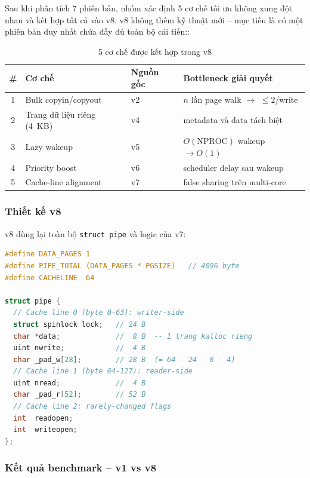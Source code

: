 \documentclass[12pt,a4paper]{article}
\newcommand{\code}[1]{\texttt{#1}}
\begin{document}
Sau khi phân tích 7 phiên bản, nhóm xác định 5 cơ chế tối ưu không xung đột nhau và
kết hợp tất cả vào v8. v8 không thêm kỹ thuật mới -- mục tiêu là có một phiên bản
duy nhất chứa đầy đủ toàn bộ cải tiến::

\begin{table}[H]
\centering
\caption{5 cơ chế được kết hợp trong v8}
\begin{tabular}{clll}
\toprule
\textbf{\#} & \textbf{Cơ chế} & \textbf{Nguồn gốc} & \textbf{Bottleneck giải quyết} \\
\midrule
1 & Bulk copyin/copyout & v2 & $n$ lần page walk $\to$ $\leq 2$/write \\
2 & Trang dữ liệu riêng (4~KB) & v4 & metadata và data tách biệt \\
3 & Lazy wakeup & v5 & $O(\text{NPROC})$ wakeup $\to O(1)$ \\
4 & Priority boost & v6 & scheduler delay sau wakeup \\
5 & Cache-line alignment & v7 & false sharing trên multi-core \\
\bottomrule
\end{tabular}
\end{table}

\subsubsection{Thiết kế v8}

v8 dùng lại toàn bộ \code{struct pipe} và logic của v7:

\begin{lstlisting}[caption={v8 -- struct pipe và PIPE\_TOTAL giống v7}, language=C]
#define DATA_PAGES 1
#define PIPE_TOTAL (DATA_PAGES * PGSIZE)   // 4096 byte
#define CACHELINE  64

struct pipe {
  // Cache line 0 (byte 0-63): writer-side
  struct spinlock lock;   // 24 B
  char *data;             //  8 B  -- 1 trang kalloc rieng
  uint nwrite;            //  4 B
  char _pad_w[28];        // 28 B  (= 64 - 24 - 8 - 4)
  // Cache line 1 (byte 64-127): reader-side
  uint nread;             //  4 B
  char _pad_r[52];        // 52 B
  // Cache line 2: rarely-changed flags
  int  readopen;
  int  writeopen;
};
\end{lstlisting}

\subsubsection{Kết quả benchmark -- v1 vs v8}
\end{document}
